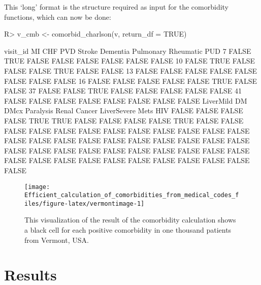 \documentclass[article]{jss}
\begin{document}
This `long' format is the structure required as input for the
comorbidity functions, which can now be done:

\begin{CodeChunk}

\begin{CodeInput}
R> v_cmb <- comorbid_charlson(v, return_df = TRUE)
\end{CodeInput}
\end{CodeChunk}\begin{CodeChunk}

\begin{CodeOutput}
 visit_id    MI   CHF   PVD Stroke Dementia Pulmonary Rheumatic   PUD
        7 FALSE  TRUE FALSE  FALSE    FALSE     FALSE     FALSE FALSE
       10 FALSE  TRUE FALSE  FALSE    FALSE      TRUE     FALSE FALSE
       13 FALSE FALSE FALSE  FALSE    FALSE     FALSE     FALSE FALSE
       16 FALSE FALSE FALSE  FALSE    FALSE      TRUE     FALSE FALSE
       37 FALSE FALSE  TRUE  FALSE    FALSE     FALSE     FALSE FALSE
       41 FALSE FALSE FALSE  FALSE    FALSE     FALSE     FALSE FALSE
 LiverMild    DM  DMcx Paralysis Renal Cancer LiverSevere  Mets   HIV
     FALSE FALSE FALSE     FALSE  TRUE   TRUE       FALSE FALSE FALSE
     FALSE  TRUE FALSE     FALSE FALSE  FALSE       FALSE FALSE FALSE
     FALSE FALSE FALSE     FALSE FALSE  FALSE       FALSE FALSE FALSE
     FALSE FALSE FALSE     FALSE FALSE  FALSE       FALSE FALSE FALSE
     FALSE FALSE FALSE     FALSE FALSE  FALSE       FALSE FALSE FALSE
     FALSE FALSE FALSE     FALSE FALSE  FALSE       FALSE FALSE FALSE
\end{CodeOutput}
\end{CodeChunk}\begin{CodeChunk}
\begin{figure}

{\centering \texttt{[image: Efficient\_calculation\_of\_comorbidities\_from\_medical\_codes\_files/figure-latex/vermontimage-1]} 

}

\caption[This visualization of the result of the comorbidity calculation shows a black cell for each positive comorbidity in one thousand patients from Vermont, USA]{This visualization of the result of the comorbidity calculation shows a black cell for each positive comorbidity in one thousand patients from Vermont, USA.}\label{fig:vermontimage}
\end{figure}
\end{CodeChunk}

\hypertarget{results}{\section{Results}\label{results}}
\end{document}
